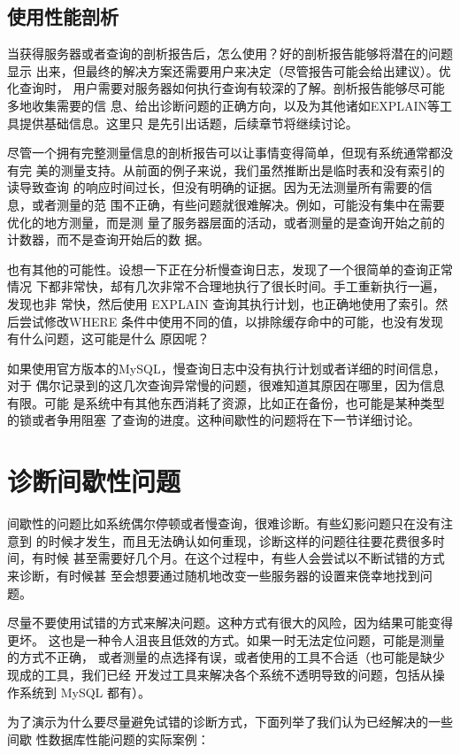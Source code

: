 {\subsection{使用性能剖析}
当获得服务器或者查询的剖析报告后，怎么使用？好的剖析报告能够将潜在的问题显示
出来，但最终的解决方案还需要用户来决定（尽管报告可能会给出建议）。优化查询时，
用户需要对服务器如何执行查询有较深的了解。剖析报告能够尽可能多地收集需要的信
息、给出诊断问题的正确方向，以及为其他诸如EXPLAIN等工具提供基础信息。这里只
是先引出话题，后续章节将继续讨论。

尽管一个拥有完整测量信息的剖析报告可以让事情变得简单，但现有系统通常都没有完
美的测量支持。从前面的例子来说，我们虽然推断出是临时表和没有索引的读导致查询
的响应时间过长，但没有明确的证据。因为无法测量所有需要的信息，或者测量的范
围不正确，有些问题就很难解决。例如，可能没有集中在需要优化的地方测量，而是测
量了服务器层面的活动，或者测量的是查询开始之前的计数器，而不是查询开始后的数
据。

也有其他的可能性。设想一下正在分析慢查询日志，发现了一个很简单的查询正常情况
下都非常快，𨚫有几次非常不合理地执行了很长时间。手工重新执行一遍，发现也非
常快，然后使用 EXPLAIN 查询其执行计划，也正确地使用了索引。然后尝试修改WHERE
条件中使用不同的值，以排除缓存命中的可能，也没有发现有什么问题，这可能是什么
原因呢？

如果使用官方版本的MySQL，慢查询日志中没有执行计划或者详细的时间信息，对于
偶尔记录到的这几次查询异常慢的问题，很难知道其原因在哪里，因为信息有限。可能
是系统中有其他东西消耗了资源，比如正在备份，也可能是某种类型的锁或者争用阻塞
了查询的进度。这种间歇性的问题将在下一节详细讨论。

\section{诊断间歇性问题}
间歇性的问题比如系统偶尔停顿或者慢查询，很难诊断。有些幻影问题只在没有注意到
的时候才发生，而且无法确认如何重现，诊断这样的问题往往要花费很多时间，有时候
甚至需要好几个月。在这个过程中，有些人会尝试以不断试错的方式来诊断，有时候甚
至会想要通过随机地改变一些服务器的设置来侥幸地找到问题。

尽量不要使用试错的方式来解决问题。这种方式有很大的风险，因为结果可能变得更坏。
这也是一种令人沮丧且低效的方式。如果一时无法定位问题，可能是测量的方式不正确，
或者测量的点选择有误，或者使用的工具不合适（也可能是缺少现成的工具，我们已经
开发过工具来解决各个系统不透明导致的问题，包括从操作系统到 MySQL 都有）。

为了演示为什么要尽量避免试错的诊断方式，下面列举了我们认为已经解决的一些间歇
性数据库性能问题的实际案例：

}
